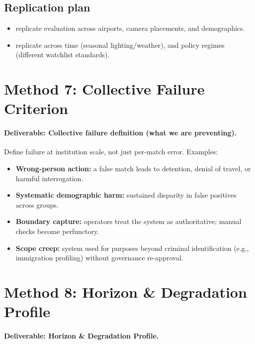 \subsection*{Replication plan}
\begin{itemize}
  \item replicate evaluation across airports, camera placements, and demographics.
  \item replicate across time (seasonal lighting/weather), and policy regimes (different watchlist standards).
\end{itemize}

\section{Method 7: Collective Failure Criterion}
\label{sec:airport-m7}

\paragraph{Deliverable: Collective failure definition (what we are preventing).}

Define failure at institution scale, not just per-match error. Examples:
\begin{itemize}
  \item \textbf{Wrong-person action:} a false match leads to detention, denial of travel, or harmful interrogation.
  \item \textbf{Systematic demographic harm:} sustained disparity in false positives across groups.
  \item \textbf{Boundary capture:} operators treat the system as authoritative; manual checks become perfunctory.
  \item \textbf{Scope creep:} system used for purposes beyond criminal identification (e.g., immigration profiling) without governance re-approval.
\end{itemize}

\section{Method 8: Horizon \& Degradation Profile}
\label{sec:airport-m8}

\paragraph{Deliverable: Horizon \& Degradation Profile.}

